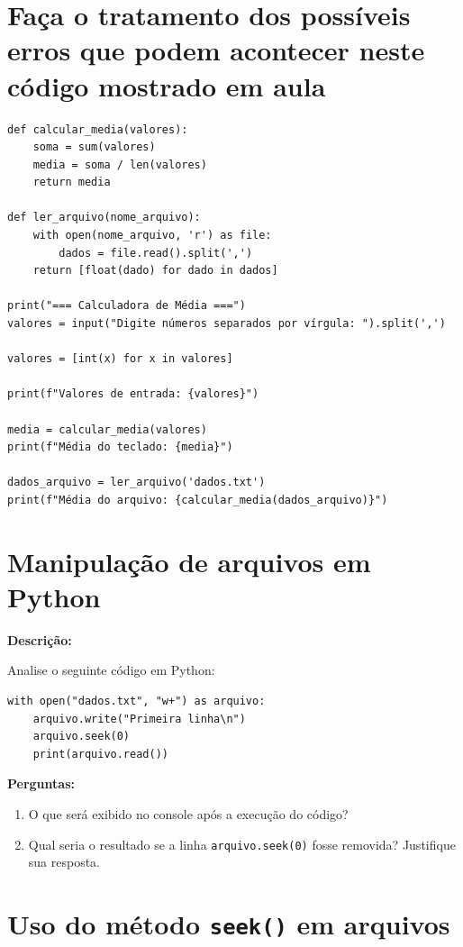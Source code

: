 \section{ Faça o tratamento dos possíveis erros que podem acontecer neste código mostrado em aula}

\begin{verbatim}
def calcular_media(valores):
    soma = sum(valores)
    media = soma / len(valores)
    return media

def ler_arquivo(nome_arquivo):
    with open(nome_arquivo, 'r') as file:
        dados = file.read().split(',')
    return [float(dado) for dado in dados]

print("=== Calculadora de Média ===")
valores = input("Digite números separados por vírgula: ").split(',')

valores = [int(x) for x in valores]

print(f"Valores de entrada: {valores}")

media = calcular_media(valores)
print(f"Média do teclado: {media}")

dados_arquivo = ler_arquivo('dados.txt')
print(f"Média do arquivo: {calcular_media(dados_arquivo)}")

\end{verbatim}

\section{Manipulação de arquivos em Python}

\textbf{Descrição:}

Analise o seguinte código em Python:

\begin{verbatim}
with open("dados.txt", "w+") as arquivo:
    arquivo.write("Primeira linha\n")
    arquivo.seek(0)
    print(arquivo.read())
\end{verbatim}

\textbf{Perguntas:}

\begin{enumerate}
    \item[a)] O que será exibido no console após a execução do código?
    \item[b)] Qual seria o resultado se a linha \texttt{arquivo.seek(0)} fosse removida? Justifique sua resposta.
\end{enumerate}


\section{Uso do método \texttt{seek()} em arquivos}

